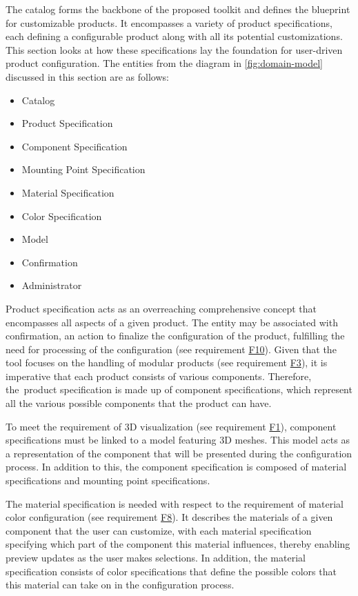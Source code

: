 The catalog forms the backbone of the proposed toolkit and defines the blueprint for customizable products. It encompasses a variety of product specifications, each defining a configurable product along with all its potential customizations. This section looks at how these specifications lay the foundation for user-driven product configuration.
The entities from the diagram in \autoref{fig:domain-model} discussed in this section are as follows:
\begin{itemize}[label=\rectanglebullet]
    \item Catalog
    \item Product Specification
    \item Component Specification
    \item Mounting Point Specification
    \item Material Specification
    \item Color Specification
    \item Model
    \item Confirmation
    \item Administrator
\end{itemize}

Product specification acts as an overreaching comprehensive concept that encompasses all aspects of a given product. The entity may be associated with confirmation, an action to finalize the configuration of the product, fulfilling the need for processing of the configuration (see requirement \hyperref[itm:F10]{F10}). Given that the tool focuses on the handling of modular products (see requirement \hyperref[itm:F3]{F3}), it is imperative that each product consists of various components. Therefore, the~product specification is made up of component specifications, which represent all the various possible components that the product can have.

To meet the requirement of 3D visualization (see requirement \hyperref[itm:F1]{F1}), component specifications must be linked to a model featuring 3D meshes. This model acts as a representation of the component that will be presented during the configuration process. In addition to this, the component specification is composed of material specifications and mounting point specifications.

The material specification is needed with respect to the requirement of material color configuration (see requirement \hyperref[itm:F8]{F8}). It describes the materials of a given component that the user can customize, with each material specification specifying which part of the component this material influences, thereby enabling preview updates as the user makes selections. In addition, the material specification consists of color specifications that define the possible colors that this material can take on in the configuration process.

